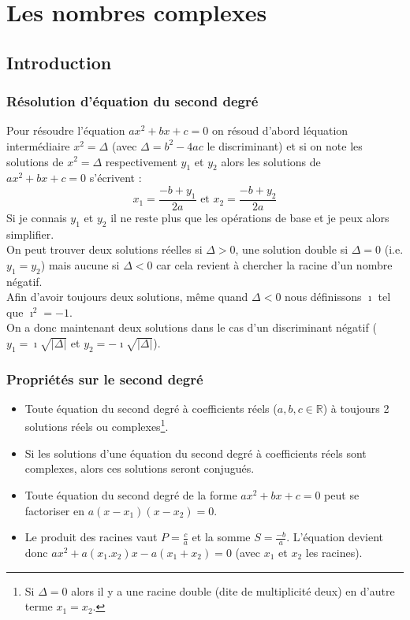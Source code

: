 \documentclass[a4paper,10pt]{report}
\begin{document}
\newpage
\chapter{Les nombres complexes}

\section{Introduction}
\subsection{Résolution d'équation du second degré}
Pour résoudre l'équation $ax^2+bx+c=0$ on résoud d'abord léquation intermédiaire $x^2=\Delta$ (avec $\Delta = b^2 - 4ac$ le discriminant) et si on note les solutions de $x^2=\Delta$ respectivement $y_1$ et $y_2$ alors les solutions de $ax^2+bx+c=0$ s'écrivent :
$$x_1=\frac{-b+y_1}{2a} \mbox{ et } x_2=\frac{-b+y_2}{2a}$$
Si je connais $y_1$ et $y_2$ il ne reste plus que les opérations de base et je peux alors simplifier.
\\On peut trouver deux solutions réelles si $\Delta > 0$, une solution double si $\Delta = 0$ (i.e. $y_1=y_2$) mais aucune si $\Delta < 0$ car cela revient à chercher la racine d'un nombre négatif.
\\Afin d'avoir toujours deux solutions, même quand $\Delta < 0$ nous définissons $\imath$ tel que $\imath^2=-1$.
\\On a donc maintenant deux solutions dans le cas d'un discriminant négatif ($y_1=\imath\sqrt{\vert\Delta\vert}$ et $y_2=-\imath\sqrt{\vert\Delta\vert}$).
\subsection{Propriétés sur le second degré}
\begin{itemize}
\item{Toute équation du second degré à coefficients réels ($a,b,c \in \mathbb{R}$) à toujours 2 solutions réels ou complexes\footnote{Si $\Delta=0$ alors il y a une racine double (dite de multiplicité deux) en d'autre terme $x_1 = x_2$.}.}
\item{Si les solutions d'une équation du second degré à coefficients réels sont complexes, alors ces solutions seront conjugués.} 
\item{Toute équation du second degré de la forme $ax^2+bx+c=0$ peut se factoriser en $a(x-x_1)(x-x_2)=0$.}
\item{Le produit des racines vaut $P=\frac{c}{a}$ et la somme $S=\frac{-b}{a}$. L'équation devient donc $ax^2+a(x_1.x_2)x-a(x_1+x_2)=0$ (avec $x_1$ et $x_2$ les racines).}
\end{itemize}
\end{document}

